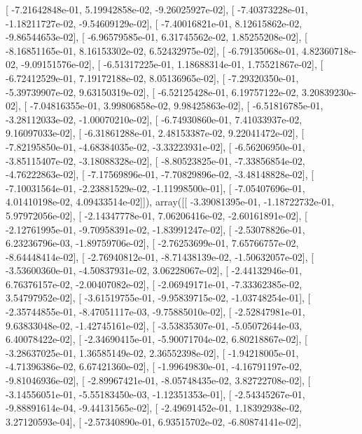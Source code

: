 \documentclass{article}
\begin{document}
       [ -7.21642848e-01,   5.19942858e-02,  -9.26025927e-02],
       [ -7.40373228e-01,  -1.18211727e-02,  -9.54609129e-02],
       [ -7.40016821e-01,   8.12615862e-02,  -9.86544653e-02],
       [ -6.96579585e-01,   6.31745562e-02,   1.85255208e-02],
       [ -8.16851165e-01,   8.16153302e-02,   6.52432975e-02],
       [ -6.79135068e-01,   4.82360718e-02,  -9.09151576e-02],
       [ -6.51317225e-01,   1.18688314e-01,   1.75521867e-02],
       [ -6.72412529e-01,   7.19172188e-02,   8.05136965e-02],
       [ -7.29320350e-01,  -5.39739907e-02,   9.63150319e-02],
       [ -6.52125428e-01,   6.19757122e-02,   3.20839230e-02],
       [ -7.04816355e-01,   3.99806858e-02,   9.98425863e-02],
       [ -6.51816785e-01,  -3.28112033e-02,  -1.00070210e-02],
       [ -6.74930860e-01,   7.41033937e-02,   9.16097033e-02],
       [ -6.31861288e-01,   2.48153387e-02,   9.22041472e-02],
       [ -7.82195850e-01,  -4.68384035e-02,  -3.33223931e-02],
       [ -6.56206950e-01,  -3.85115407e-02,  -3.18088328e-02],
       [ -8.80523825e-01,  -7.33856854e-02,  -4.76222863e-02],
       [ -7.17569896e-01,  -7.70829896e-02,  -3.48148828e-02],
       [ -7.10031564e-01,  -2.23881529e-02,  -1.11998500e-01],
       [ -7.05407696e-01,   4.01410198e-02,   4.09433514e-02]]), array([[ -3.39081395e-01,  -1.18722732e-01,   5.97972056e-02],
       [ -2.14347778e-01,   7.06206416e-02,  -2.60161891e-02],
       [ -2.12761995e-01,  -9.70958391e-02,  -1.83991247e-02],
       [ -2.53078826e-01,   6.23236796e-03,  -1.89759706e-02],
       [ -2.76253699e-01,   7.65766757e-02,  -8.64448414e-02],
       [ -2.76940812e-01,  -8.71438139e-02,  -1.50632057e-02],
       [ -3.53600360e-01,  -4.50837931e-02,   3.06228067e-02],
       [ -2.44132946e-01,   6.76376157e-02,  -2.00407082e-02],
       [ -2.06949171e-01,  -7.33362385e-02,   3.54797952e-02],
       [ -3.61519755e-01,  -9.95839715e-02,  -1.03748254e-01],
       [ -2.35744855e-01,  -8.47051117e-03,  -9.75885010e-02],
       [ -2.52847981e-01,   9.63833048e-02,  -1.42745161e-02],
       [ -3.53835307e-01,  -5.05072644e-03,   6.40078422e-02],
       [ -2.34690415e-01,  -5.90071704e-02,   6.80218867e-02],
       [ -3.28637025e-01,   1.36585149e-02,   2.36552398e-02],
       [ -1.94218005e-01,  -4.71396386e-02,   6.67421360e-02],
       [ -1.99649830e-01,  -4.16791197e-02,  -9.81046936e-02],
       [ -2.89967421e-01,  -8.05748435e-02,   3.82722708e-02],
       [ -3.14556051e-01,  -5.55183450e-03,  -1.12351353e-01],
       [ -2.54345267e-01,  -9.88891614e-04,  -9.44131565e-02],
       [ -2.49691452e-01,   1.18392938e-02,   3.27120593e-04],
       [ -2.57340890e-01,   6.93515702e-02,  -6.80874141e-02],
\end{document}
